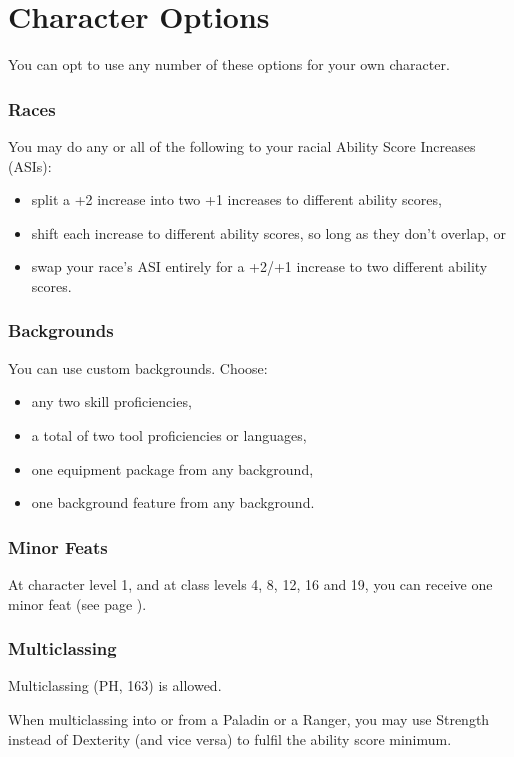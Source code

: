 \documentclass[letterpaper,twocolumn,openany,nodeprecatedcode,bg=print]{dndbook}
\newcommand{\pg}[1]{page \pageref{#1}}
\newcommand{\see}[1]{(see \pg{#1})}
\begin{document}
\chapter{Character Options}
\noindent You can opt to use any number of these options for your own character.

\subsection{Races}
You may do any or all of the following to your racial Ability Score Increases (ASIs):

\begin{itemize}
\item split a +2 increase into two +1 increases to different ability scores,
\item shift each increase to different ability scores, so long as they don't overlap, or
\item swap your race's ASI entirely for a +2/+1 increase to two different ability scores.
\end{itemize}

\subsection{Backgrounds}
You can use custom backgrounds. Choose:
\begin{itemize}
\item any two skill proficiencies,
\item a total of two tool proficiencies or languages, 
\item one equipment package from any background,
\item one background feature from any background.
\end{itemize}

\subsection{Minor Feats}
\label{minor-feats}
At character level 1, and at class levels 4, 8, 12, 16 and 19, 
you can receive one minor feat \see{minor-feats-table}.

\subsection{Multiclassing}
Multiclassing (PH, 163) is allowed. 

When multiclassing into or from a Paladin or a Ranger, 
you may use Strength instead of Dexterity (and vice versa) to fulfil the ability score minimum. 
\end{document}
